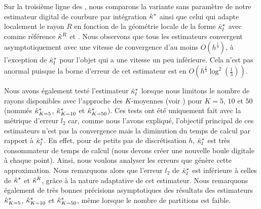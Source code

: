 Sur la troisième ligne des
, nous
comparons la variante sans paramètre de notre estimateur digital de courbure par
intégration $\hat{\kappa}^{*}$ ainsi que celui qui adapte localement le rayon $R$ en
fonction de la géométrie locale de la forme $\hat{\kappa}^{*}_{l}$ avec comme référence
$\hat{\kappa}^{R}$ et \MDCA. Nous observons que tous les estimateurs convergent
asymptotiquement avec une vitesse de convergence d'au moins $O(h^\frac{1}{3})$, à
l'exception de $\hat{\kappa}^{*}_{l}$ pour l'objet \Ellipse qui a une vitesse un peu
inférieure. Cela n'est pas anormal puisque la borne d'erreur de cet estimateur
est en $O\left(h^\frac{1}{3} \log^2\left(\frac{1}{3}\right)\right)$.


Nous avons également testé l'estimateur $\hat{\kappa}^{*}_{l}$ lorsque nous limitons le
nombre de rayons disponibles avec l'approche des $K$-moyennes (voir
) pour $K = 5$, $10$ et $50$
(nommés $\hat{\kappa}^{*}_{K=5}$, $\hat{\kappa}^{*}_{K=10}$ et $\hat{\kappa}^{*}_{K=50}$). Ces tests ont été
uniquement fait avec la métrique d'erreur $l_2$ car, comme nous l'avons
expliqué, l'objectif principal de ces estimateurs n'est pas la convergence mais
la diminution du temps de calcul par rapport à $\hat{\kappa}^{*}_{l}$. En effet, pour de
petits pas de discrétisation $h$, $\hat{\kappa}^{*}_{l}$ est très consommateur de temps de
calcul (nous devons créer une nouvelle boule digitale à chaque point). Ainsi,
nous voulons analyser les erreurs que génère cette approximation. Nous
remarquons alors que l'erreur $l_2$ de $\hat{\kappa}^{*}_{l}$ est inférieure à celles de
$\hat{\kappa}^{*}$ et $\hat{\kappa}^{R}$, grâce à la nature adaptative de cet estimateur. Nous
remarquons également de très bonnes précisions asymptotiques des résultats des
estimateurs $\hat{\kappa}^{*}_{K=5}$, $\hat{\kappa}^{*}_{K=10}$ et $\hat{\kappa}^{*}_{K=50}$, même lorsque le
nombre de partitions est faible.
%
